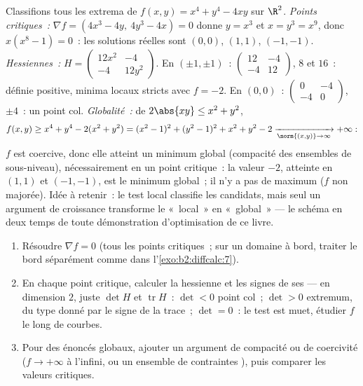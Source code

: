 \begin{example}\label{ex:b2:diffcalc:quarticrun}
Classifions tous les extrema de $f(x, y) = x^4 + y^4 - 4xy$ sur
$\R^2$. \emph{Points critiques~:} $\nabla f = (4x^3 - 4y,\ 4y^3 -
4x) = 0$ donne $y = x^3$ et $x = y^3 = x^9$, donc $x(x^8 - 1) = 0$~:
les solutions réelles sont $(0,0)$, $(1,1)$, $(-1,-1)$.
\emph{Hessiennes~:} $H = \begin{pmatrix} 12x^2 & -4\\ -4 &
12y^2\end{pmatrix}$. En $(\pm1, \pm1)$~: $\begin{pmatrix} 12 &
-4\\ -4 & 12\end{pmatrix}$,  $8$ et $16$~: définie
positive, minima locaux stricts avec $f = -2$. En $(0,0)$~:
$\begin{pmatrix} 0 & -4\\ -4 & 0\end{pmatrix}$, 
$\pm4$~: un point col. \emph{Globalité~:} de $2\abs{xy} \leq x^2 +
y^2$,
\[
f(x, y) \geq x^4 + y^4 - 2(x^2 + y^2)
= (x^2 - 1)^2 + (y^2 - 1)^2 + x^2 + y^2 - 2
\xrightarrow[\norm{(x,y)}\to\infty]{} +\infty :
\]
$f$ est coercive, donc elle atteint un minimum global (compacité des
ensembles de sous-niveau), nécessairement en un point critique~: la
valeur $-2$, atteinte en $(1,1)$ et $(-1,-1)$, est le minimum
global~; il n'y a pas de maximum ($f$ non majorée). Idée à retenir~:
le test local classifie les candidats, mais seul un argument de
croissance transforme le «~local~» en «~global~» --- le schéma en
deux temps de toute démonstration d'optimisation de ce livre.
\end{example}

\begin{method}\label{met:b2:diffcalc:extrema}
\begin{enumerate}
  \item Résoudre $\nabla f = 0$ (tous les points critiques~; sur un
        domaine à bord, traiter le bord séparément comme dans
        l'\cref{exo:b2:diffcalc:7}).
  \item En chaque point critique, calculer la hessienne et les signes
        de ses  --- en dimension $2$, juste $\det H$
        et $\operatorname{tr} H$~: $\det < 0$ point col~; $\det >
        0$ extremum, du type donné par le signe de la trace~; $\det =
        0$~: le test est muet, étudier $f$ le long de courbes.
  \item Pour des énoncés globaux, ajouter un argument de compacité ou
        de coercivité ($f \to +\infty$ à l'infini, ou un ensemble de
        contraintes ), puis comparer les valeurs critiques.
\end{enumerate}
\end{method}

